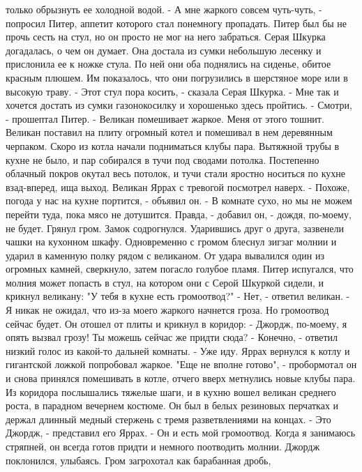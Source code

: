 только обрызнуть ее холодной водой.
    - А мне жаркого совсем чуть-чуть, - попросил Питер, аппетит 
которого стал понемногу пропадать.
    Питер был бы не прочь сесть на стул, но он просто не мог на него 
забраться. Серая Шкурка догадалась, о чем он думает. Она достала из 
сумки небольшую лесенку и прислонила ее к ножке стула. По ней они оба 
поднялись на сиденье, обитое красным плюшем. Им показалось, что они 
погрузились в шерстяное море или в высокую траву.
    - Этот стул пора косить, - сказала Серая Шкурка. - Мне так и 
хочется достать из сумки газонокосилку и хорошенько здесь пройтись.
    - Смотри, - прошептал Питер. - Великан помешивает жаркое. Меня от 
этого тошнит.
    Великан поставил на плиту огромный котел и помешивал в нем 
деревянным черпаком. Скоро из котла начали подниматься клубы пара. 
Вытяжной трубы в кухне не было, и пар собирался в тучи под сводами 
потолка. Постепенно облачный покров окутал весь потолок, и тучи стали 
яростно носиться по кухне взад-вперед, ища выход.
    Великан Яррах с тревогой посмотрел наверх.
    - Похоже, погода у нас на кухне портится, - объявил он. - В 
комнате сухо, но мы не можем перейти туда, пока мясо не дотушится. 
Правда, - добавил он, - дождя, по-моему, не будет.
    Грянул гром. Замок содрогнулся. Ударившись друг о друга, зазвенели 
чашки на кухонном шкафу. Одновременно с громом блеснул зигзаг молнии и 
ударил в каменную полку рядом с великаном. От удара вывалился один из 
огромных камней, сверкнуло, затем погасло голубое пламя.
    Питер испугался, что молния может попасть в стул, на котором они с 
Серой Шкуркой сидели, и крикнул великану: "У тебя в кухне есть 
громоотвод?"
    - Нет, - ответил великан. - Я никак не ожидал, что из-за моего 
жаркого начнется гроза. Но громоотвод сейчас будет.
    Он отошел от плиты и крикнул в коридор:
    - Джордж, по-моему, я опять вызвал грозу! Ты можешь сейчас же 
придти сюда?
    - Конечно, - ответил низкий голос из какой-то дальней комнаты. - 
Уже иду.
    Яррах вернулся к котлу и гигантской ложкой попробовал жаркое. "Еще 
не вполне готово", - пробормотал он и снова принялся помешивать в 
котле, отчего вверх метнулись новые клубы пара.
    Из коридора послышались тяжелые шаги, и в кухню вошел великан 
среднего роста, в парадном вечернем костюме. Он был в белых резиновых 
перчатках и держал длинный медный стержень с тремя разветвлениями на 
концах.
    - Это Джордж, - представил его Яррах. - Он и есть мой громоотвод. 
Когда я занимаюсь стряпней, он всегда готов придти и немного 
поотводить молнии.
    Джордж поклонился, улыбаясь. Гром загрохотал как барабанная дробь, 
